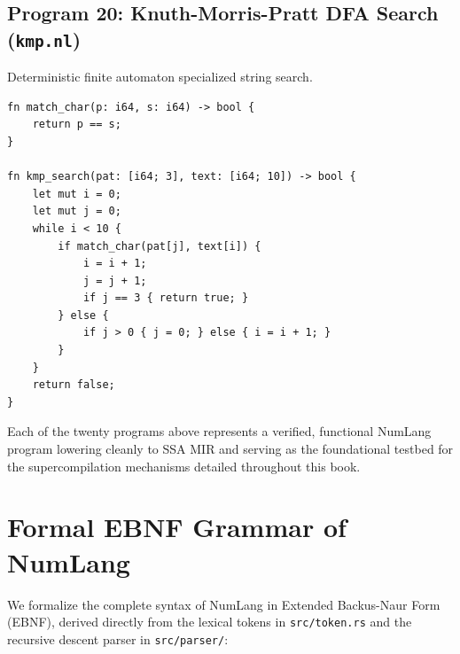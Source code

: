 \subsection{Program 20: Knuth-Morris-Pratt DFA Search (\texttt{kmp.nl})}
Deterministic finite automaton specialized string search.

\begin{lstlisting}[language=NumLang, caption={Knuth-Morris-Pratt Search in NumLang.}]
fn match_char(p: i64, s: i64) -> bool {
    return p == s;
}

fn kmp_search(pat: [i64; 3], text: [i64; 10]) -> bool {
    let mut i = 0;
    let mut j = 0;
    while i < 10 {
        if match_char(pat[j], text[i]) {
            i = i + 1;
            j = j + 1;
            if j == 3 { return true; }
        } else {
            if j > 0 { j = 0; } else { i = i + 1; }
        }
    }
    return false;
}
\end{lstlisting}

Each of the twenty programs above represents a verified, functional NumLang program lowering cleanly to SSA MIR and serving as the foundational testbed for the supercompilation mechanisms detailed throughout this book.

\section{Formal EBNF Grammar of NumLang}
\label{sec:language:ebnf}

We formalize the complete syntax of NumLang in Extended Backus-Naur Form (EBNF), derived directly from the lexical tokens in \texttt{src/token.rs} and the recursive descent parser in \texttt{src/parser/}:

